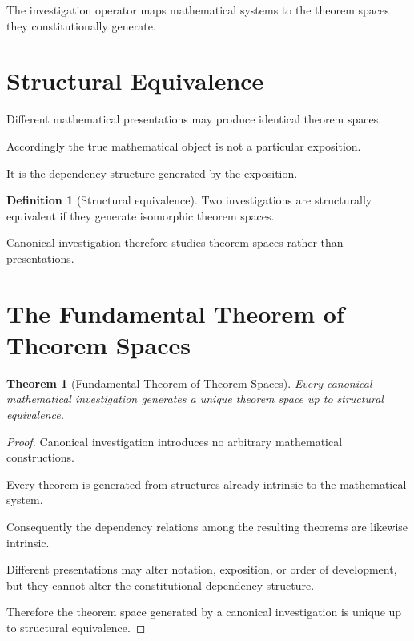 \documentclass[13pt,openany]{book}
\theoremstyle{plain}
\newtheorem{theorem}{Theorem}[chapter]
\theoremstyle{definition}
\newtheorem{definition}{Definition}[chapter]
\begin{document}
The investigation operator maps mathematical systems to the theorem spaces they
constitutionally generate.

\section{Structural Equivalence}

Different mathematical presentations may produce identical theorem spaces.

Accordingly the true mathematical object is not a particular exposition.

It is the dependency structure generated by the exposition.

\begin{definition}[Structural equivalence]
Two investigations are structurally equivalent if they generate isomorphic
theorem spaces.
\end{definition}

Canonical investigation therefore studies theorem spaces rather than
presentations.

\section{The Fundamental Theorem of Theorem Spaces}

\begin{theorem}[Fundamental Theorem of Theorem Spaces]
Every canonical mathematical investigation generates a unique theorem space up
to structural equivalence.
\end{theorem}

\begin{proof}
Canonical investigation introduces no arbitrary mathematical constructions.

Every theorem is generated from structures already intrinsic to the
mathematical system.

Consequently the dependency relations among the resulting theorems are likewise
intrinsic.

Different presentations may alter notation, exposition, or order of
development, but they cannot alter the constitutional dependency structure.

Therefore the theorem space generated by a canonical investigation is unique up
to structural equivalence.
\end{proof}
\end{document}
